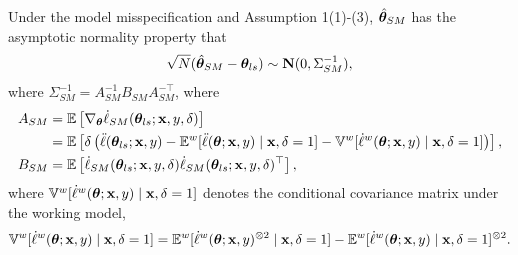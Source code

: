 \documentclass[12pt,hidelinks]{article}
\begin{document}
\begin{proposition}
        Under the model misspecification and Assumption 1(1)-(3), ${\hat{\bm{\theta}}}_{SM}$ has the asymptotic normality property that 
    \begin{align}
        \sqrt{N} ({\hat{\bm{\theta}}}_{SM} - \bm{\theta}_{ls}) \sim \mathbf{N}(0, \Sigma_{SM}^{-1}),
    \end{align}
    where $\Sigma_{SM}^{-1} = A_{SM}^{-1} B_{SM} A_{SM}^{-\top}$, where
    \begin{align}\label{eq:ABSM}
    A_{SM} &= \mathbb{E} \left[\nabla_{\bm{\theta}} \dot \ell_{SM}(\bm{\theta}_{ls}; \mathbf{x}, y, \delta) \right] \notag \\
    &= \mathbb{E} \left[ \delta \left(\ddot \ell(\bm{\theta}_{ls}; \mathbf{x}, y) - \mathbb{E}^w [\ddot \ell (\bm{\theta}; \mathbf{x}, y) \mid \mathbf{x}, \delta=1] - \mathbb{V}^w [\dot \ell^w (\bm{\theta}; \mathbf{x}, y) \mid \mathbf{x}, \delta=1] \right) \right], \\    
    B_{SM} &= \mathbb{E} \left[\dot \ell_{SM}(\bm{\theta}_{ls}; \mathbf{x}, y, \delta)\dot \ell_{SM}(\bm{\theta}_{ls}; \mathbf{x}, y, \delta)^\top \right],
\end{align}
where $\mathbb{V}^w[\dot \ell^w(\bm{\theta};\mathbf{x},y) \mid \mathbf{x}, \delta=1]$ denotes the conditional covariance matrix under the working model,
\begin{equation*}
    \mathbb{V}^w[\dot \ell^w(\bm{\theta};\mathbf{x},y)\mid \mathbf{x},\delta=1] 
    = \mathbb{E}^w[\dot \ell^w(\bm{\theta};\mathbf{x},y)^{\otimes 2}\mid \mathbf{x},\delta=1]
    - \mathbb{E}^w[\dot \ell^w(\bm{\theta};\mathbf{x},y)\mid \mathbf{x},\delta=1]^{\otimes 2}.
\end{equation*}
\end{proposition}
\end{document}
